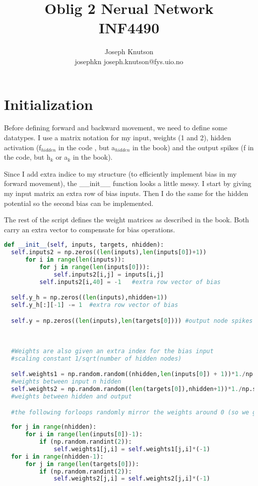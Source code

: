 \documentclass[10pt, a4paper]{article}
\title{Oblig 2 Nerual Network \\
  \hrulefill\small{ INF4490 }\hrulefill}
\author{Joseph Knutson \\
josephkn   joseph.knutson@fys.uio.no}
\begin{document}
\maketitle
\tableofcontents
\clearpage
\section{Initialization}
Before defining forward and backward movement, we need to define some datatypes.
I use a matrix notation for my input, weights (1 and 2), hidden activation (f$_{hidden}$ in the code , but a$_{hidden}$ in the book) and the output spikes (f in the code, but h$_{k}$ or a$_k$ in the book).

Since I add extra indice to my structure (to efficiently implement bias in my forward movement), the \_\_init\_\_ function looks a little messy. I start by giving my input matrix an extra row of bias inputs.
Then I do the same for the hidden potential so the second bias can be implemented.

The rest of the script defines the weight matrices as described in the book. Both carry an extra vector to compensate for bias operations.
\begin{lstlisting}[language = Python]
def __init__(self, inputs, targets, nhidden):
  self.inputs2 = np.zeros((len(inputs),len(inputs[0])+1))
      for i in range(len(inputs)):
          for j in range(len(inputs[0])):       
              self.inputs2[i,j] = inputs[i,j]
          self.inputs2[i,40] = -1   #extra row vector of bias

  self.y_h = np.zeros((len(inputs),nhidden+1))
  self.y_h[:][-1] -= 1  #extra row vector of bias

  self.y = np.zeros((len(inputs),len(targets[0]))) #output node spikes

  
  
  #Weights are also given an extra index for the bias input
  #scaling constant 1/sqrt(number of hidden nodes)

  self.weights1 = np.random.random((nhidden,len(inputs[0]) + 1))*1./np.sqrt(nhidden+1) 
  #weights between input n hidden
  self.weights2 = np.random.random((len(targets[0]),nhidden+1))*1./np.sqrt(len(targets[0])+1)
  #weights between hidden and output

  #the following forloops randomly mirror the weights around 0 (so we get negative weights too)
  
  for j in range(nhidden): 
      for i in range(len(inputs[0])-1):
          if (np.random.randint(2)): 
              self.weights1[j,i] = self.weights1[j,i]*(-1)   
  for i in range(nhidden-1):
      for j in range(len(targets[0])):
          if (np.random.randint(2)): 
              self.weights2[j,i] = self.weights2[j,i]*(-1)
\end{lstlisting}
\end{document}
